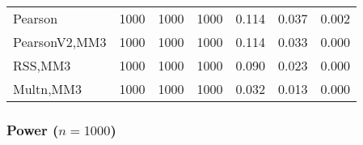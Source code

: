 \documentclass[
]{article}
\begin{document}
\begin{table}[H]
{\begin{tabular}[t]{lrrrrrr}
\hspace{1em}Pearson & 1000 & 1000 & 1000 & 0.114 & 0.037 & 0.002\\
\hspace{1em}PearsonV2,MM3 & 1000 & 1000 & 1000 & 0.114 & 0.033 & 0.000\\
\hspace{1em}RSS,MM3 & 1000 & 1000 & 1000 & 0.090 & 0.023 & 0.000\\
\hspace{1em}Multn,MM3 & 1000 & 1000 & 1000 & 0.032 & 0.013 & 0.000\\
\bottomrule
\end{tabular}}
\end{table}

\hypertarget{power-n1000-3}{%
\subsubsection{\texorpdfstring{Power
(\(n=1000\))}{Power (n=1000)}}\label{power-n1000-3}}
\end{document}
